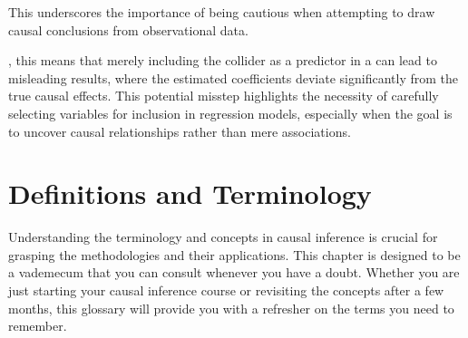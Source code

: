 \documentclass[letterpaper,10pt,english]{jupyterBook}
\begin{document}
\sphinxAtStartPar
This underscores the importance of being cautious when attempting to draw causal conclusions from observational data.

\sphinxAtStartPar
{}, this means that merely including the collider as a predictor in a  can lead to misleading results, where the estimated coefficients deviate significantly from the true causal effects. This potential misstep highlights the necessity of carefully selecting variables for inclusion in regression models, especially when the goal is to uncover causal relationships rather than mere associations.

\sphinxstepscope


\chapter{Definitions and Terminology}
\label{\detokenize{notebooks/glossary:definitions-and-terminology}}\label{\detokenize{notebooks/glossary::doc}}
\sphinxAtStartPar
Understanding the terminology and concepts in causal inference is crucial for grasping the methodologies and their applications. This chapter is designed to be a vademecum that you can consult whenever you have a doubt. Whether you are just starting your causal inference course or revisiting the concepts after a few months, this glossary will provide you with a refresher on the terms you need to remember.
\end{document}
